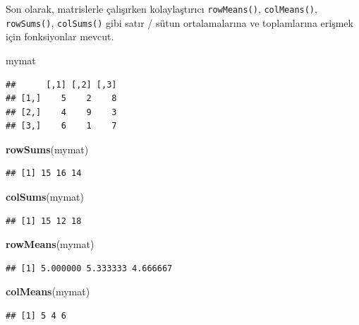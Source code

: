 \documentclass[
]{book}
\newenvironment{Shaded}{\begin{snugshade}}{\end{snugshade}}
\newcommand{\KeywordTok}[1]{\textcolor[rgb]{0.13,0.29,0.53}{\textbf{#1}}}
\newcommand{\NormalTok}[1]{#1}
\begin{document}
Son olarak, matrislerle çalışırken kolaylaştırıcı \texttt{rowMeans()}, \texttt{colMeans()}, \texttt{rowSums()}, \texttt{colSums()} gibi satır / sütun ortalamalarına ve toplamlarına erişmek için fonksiyonlar mevcut.

\begin{Shaded}
\begin{Highlighting}[]
\NormalTok{mymat}
\end{Highlighting}
\end{Shaded}

\begin{verbatim}
##      [,1] [,2] [,3]
## [1,]    5    2    8
## [2,]    4    9    3
## [3,]    6    1    7
\end{verbatim}

\begin{Shaded}
\begin{Highlighting}[]
\KeywordTok{rowSums}\NormalTok{(mymat)}
\end{Highlighting}
\end{Shaded}

\begin{verbatim}
## [1] 15 16 14
\end{verbatim}

\begin{Shaded}
\begin{Highlighting}[]
\KeywordTok{colSums}\NormalTok{(mymat)}
\end{Highlighting}
\end{Shaded}

\begin{verbatim}
## [1] 15 12 18
\end{verbatim}

\begin{Shaded}
\begin{Highlighting}[]
\KeywordTok{rowMeans}\NormalTok{(mymat)}
\end{Highlighting}
\end{Shaded}

\begin{verbatim}
## [1] 5.000000 5.333333 4.666667
\end{verbatim}

\begin{Shaded}
\begin{Highlighting}[]
\KeywordTok{colMeans}\NormalTok{(mymat)}
\end{Highlighting}
\end{Shaded}

\begin{verbatim}
## [1] 5 4 6
\end{verbatim}
\end{document}
